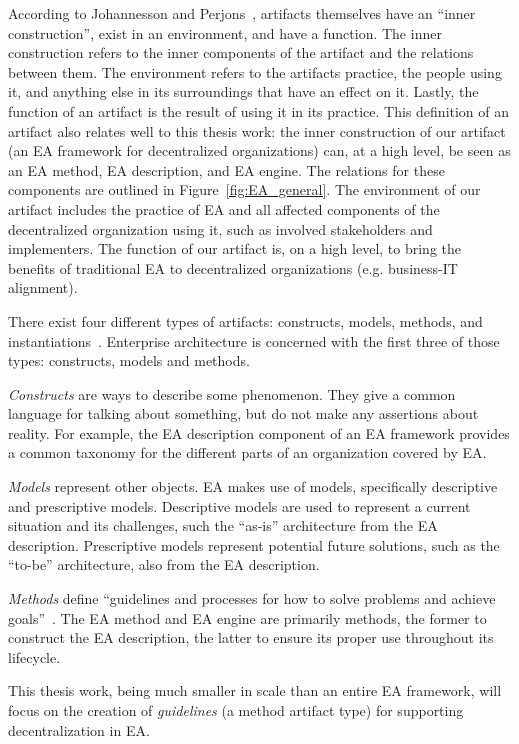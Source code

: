 According to Johannesson and Perjons~\cite[Ch. 1]{johannessonPerjons2012}, artifacts themselves have an ``inner construction'', exist in an environment, and have a function. The inner construction refers to the inner components of the artifact and the relations between them. The environment refers to the artifacts practice, the people using it, and anything else in its surroundings that have an effect on it. Lastly, the function of an artifact is the result of using it in its practice. This definition of an artifact also relates well to this thesis work: the inner construction of our artifact (an EA framework for decentralized organizations) can, at a high level, be seen as an EA method, EA description, and EA engine. The relations for these components are outlined in Figure~\ref{fig:EA_general}. The environment of our artifact includes the practice of EA and all affected components of the decentralized organization using it, such as involved stakeholders and implementers. The function of our artifact is, on a high level, to bring the benefits of traditional EA to decentralized organizations (e.g. business-IT alignment).

There exist four different types of artifacts: constructs, models, methods, and instantiations~\cite{hevner2004,johannessonPerjons2012}. Enterprise architecture is concerned with the first three of those types: constructs, models and methods. 

\textit{Constructs} are ways to describe some phenomenon. They give a common language for talking about something, but do not make any assertions about reality. For example, the EA description component of an EA framework provides a common taxonomy for the different parts of an organization covered by EA. 

\textit{Models} represent other objects. EA makes use of models, specifically descriptive and prescriptive models. Descriptive models are used to represent a current situation and its challenges, such the ``as-is'' architecture from the EA description. Prescriptive models represent potential future solutions, such as the ``to-be'' architecture, also from the EA description.

\textit{Methods} define ``guidelines and processes for how to solve problems and achieve goals''~\cite[Ch. 1]{johannessonPerjons2012}. The EA method and EA engine  are primarily methods, the former to construct the EA description, the latter to ensure its proper use throughout its lifecycle. 

This thesis work, being much smaller in scale than an entire EA framework, will focus on the creation of \textit{guidelines} (a method artifact type) for supporting decentralization in EA.

